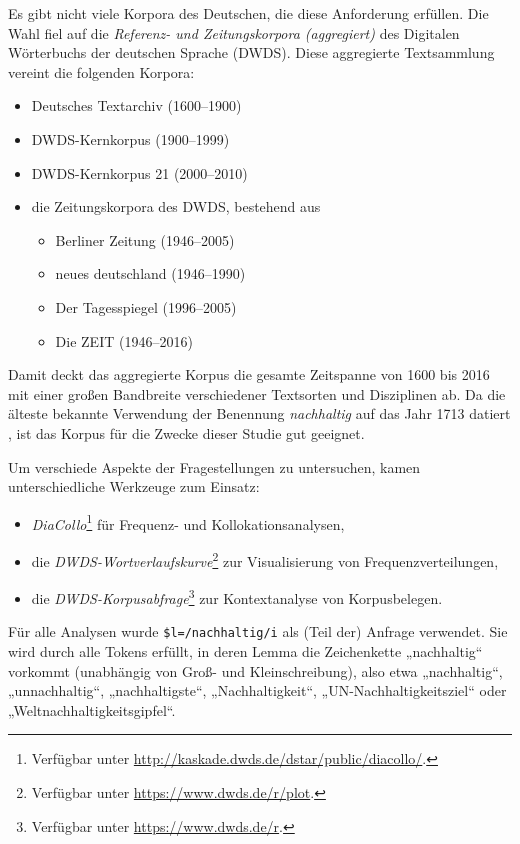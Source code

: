 \documentclass[
    german,
    a4paper,%
    12pt,%
    oneside,%
    toc=bibliography,
    final,
]{scrartcl}
\begin{document}
Es gibt nicht viele Korpora des Deutschen, die diese Anforderung erfüllen. Die Wahl fiel auf die \textit{Referenz- und Zeitungskorpora (aggregiert)} des Digitalen Wörterbuchs der deutschen Sprache (DWDS). Diese aggregierte Textsammlung vereint die folgenden Korpora:

\begin{itemize}
\item Deutsches Textarchiv (1600–1900) \citep[vgl.][]{Geyken2011}
\item DWDS-Kernkorpus (1900–1999) \citep[vgl.][]{Geyken2007}
\item DWDS-Kernkorpus 21 (2000–2010) \citep[vgl.][]{Geyken2007}
\item die Zeitungskorpora des DWDS, bestehend aus
	\begin{itemize}
	\item Berliner Zeitung (1946–2005)
	\item neues deutschland (1946–1990)
	\item Der Tagesspiegel (1996–2005)
	\item Die ZEIT (1946–2016)
	\end{itemize}
\end{itemize}

Damit deckt das aggregierte Korpus die gesamte Zeitspanne von 1600 bis 2016 mit einer großen Bandbreite verschiedener Textsorten und Disziplinen ab. Da die älteste bekannte Verwendung der Benennung \textit{nachhaltig} auf das Jahr 1713 datiert \citep[vgl.][99]{Zürcher1965}, ist das Korpus für die Zwecke dieser Studie gut geeignet.

Um verschiede Aspekte der Fragestellungen zu untersuchen, kamen unterschiedliche Werkzeuge zum Einsatz:

\begin{itemize}
\item \textit{DiaCollo}\footnote{Verfügbar unter \url{http://kaskade.dwds.de/dstar/public/diacollo/}.} \citep{Jurish2015} für Frequenz- und Kollokationsanalysen,
\item die \textit{DWDS-Wortverlaufskurve}\footnote{Verfügbar unter \url{https://www.dwds.de/r/plot}.} zur Visualisierung von Frequenzverteilungen,
\item die \textit{DWDS-Korpusabfrage}\footnote{Verfügbar unter \url{https://www.dwds.de/r}.} zur Kontextanalyse von Korpusbelegen.
\end{itemize}

Für alle Analysen wurde \lstinline|$l=/nachhaltig/i| als (Teil der) Anfrage verwendet. Sie wird durch alle Tokens erfüllt, in deren Lemma die Zeichenkette „nachhaltig“ vorkommt (unabhängig von Groß- und Kleinschreibung), also etwa „nachhaltig“, „unnachhaltig“, „nachhaltigste“, „Nachhaltigkeit“, „UN-Nach\-haltig\-keits\-ziel“ oder „Weltnachhaltigkeitsgipfel“.
\end{document}
